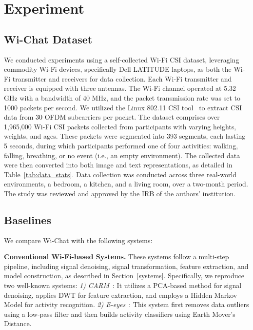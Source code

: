 \section{Experiment}
\subsection{Wi-Chat Dataset}

We conducted experiments using a self-collected Wi-Fi CSI dataset, leveraging commodity Wi-Fi devices, specifically Dell LATITUDE laptops, as both the Wi-Fi transmitter and receivers for data collection. Each Wi-Fi transmitter and receiver is equipped with three antennas. The Wi-Fi channel operated at 5.32 GHz with a bandwidth of 40 MHz, and the packet transmission rate was set to 1000 packets per second. We utilized the Linux 802.11 CSI tool~\cite{halperin2011tool} to extract CSI data from 30 OFDM subcarriers per packet. The dataset comprises over 1,965,000 Wi-Fi CSI packets collected from participants with varying heights, weights, and ages. These packets were segmented into 393 segments, each lasting 5 seconds, during which participants performed one of four activities: walking, falling, breathing, or no event (i.e., an empty environment). The collected data were then converted into both image and text representations, as detailed in Table~\ref{tab:data_stats}. Data collection was conducted across three real-world environments, a bedroom, a kitchen, and a living room, over a two-month period. The study was reviewed and approved by the IRB of the authors' institution.


\vspace{-1mm}
\subsection{Baselines}
\vspace{-2mm}
We compare Wi-Chat with the following systems: 

\textbf{Conventional Wi-Fi-based Systems.} These systems follow a multi-step pipeline, including signal denoising, signal transformation, feature extraction, and model construction, as described in Section~\ref{systems}. Specifically, we reproduce two well-known systems:
\textit{1) CARM}~\cite{wang2015understanding}: It utilizes a PCA-based method for signal denoising, applies DWT for feature extraction, and employs a Hidden Markov Model for activity recognition.
\textit{2) E-eyes}~\cite{wang2014eyes}: This system first removes data outliers using a low-pass filter and then builds activity classifiers using Earth Mover's Distance.

